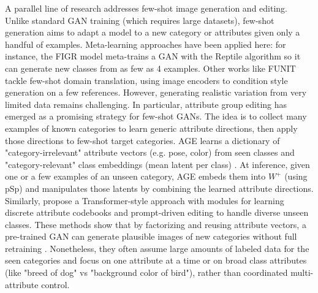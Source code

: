 A parallel line of research addresses few-shot image generation and editing. 
Unlike standard GAN training (which requires large datasets), 
few-shot generation aims to adapt a model to a new category or attributes given only a handful of examples. 
Meta-learning approaches have been applied here: for instance, the FIGR model \cite{clouatre2019figrfewshotimagegeneration} meta-trains a GAN with the Reptile algorithm so it can generate new classes from as few as 4 examples.
Other works like FUNIT \cite{liu2019fewshotunsupervisedimagetoimagetranslation} tackle few-shot domain translation, using image encoders to condition style 
generation on a few references. However, generating realistic variation from very limited data remains challenging.
In particular, attribute group editing has emerged as a promising strategy for few-shot GANs. 
The idea is to collect many examples of known categories to learn generic attribute directions, 
then apply those directions to few-shot target categories. 
AGE learns a dictionary of "category-irrelevant" attribute vectors (e.g. pose, color) 
from seen classes and "category-relevant" class embeddings (mean latent per class) \cite{AGE}.
At inference, given one or a few examples of an unseen category, AGE embeds them into $W^+$ (using pSp) and manipulates those latents by combining the learned attribute directions.
Similarly,\cite{zhang2024tagetrustworthyattributegroup} propose a Transformer-style approach with modules for learning discrete attribute codebooks and prompt-driven editing to handle diverse unseen classes.
These methods show that by factorizing and reusing attribute vectors, a pre-trained GAN can generate plausible images of new categories without full retraining \cite{AGE}.
Nonetheless, they often assume large amounts of labeled data for the seen categories and focus on one attribute at a time or on broad class attributes (like "breed of dog" vs "background color of bird"), rather than coordinated multi-attribute control.

